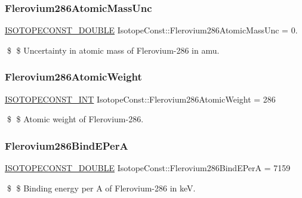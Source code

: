 \subsubsection{\texorpdfstring{Flerovium286\+Atomic\+Mass\+Unc}{Flerovium286AtomicMassUnc}}
{\footnotesize\ttfamily \mbox{\hyperlink{group___isotope_const-_macros_ga8f45a7272ce02c0b4c65c44636ed719a}{I\+S\+O\+T\+O\+P\+E\+C\+O\+N\+S\+T\+\_\+\+D\+O\+U\+B\+LE}} Isotope\+Const\+::\+Flerovium286\+Atomic\+Mass\+Unc = 0.}

\$ \$ Uncertainty in atomic mass of Flerovium-\/286 in amu. \mbox{\label{group___isotope_const-_flerovium-_fl286_ga8382386b9c6b32c2d349fae354067109}} 
\subsubsection{\texorpdfstring{Flerovium286\+Atomic\+Weight}{Flerovium286AtomicWeight}}
{\footnotesize\ttfamily \mbox{\hyperlink{group___isotope_const-_macros_ga5f18360b3e99483a35c32d789e62621c}{I\+S\+O\+T\+O\+P\+E\+C\+O\+N\+S\+T\+\_\+\+I\+NT}} Isotope\+Const\+::\+Flerovium286\+Atomic\+Weight = 286}

\$ \$ Atomic weight of Flerovium-\/286. \mbox{\label{group___isotope_const-_flerovium-_fl286_ga03c7d05a4f075f239303651c3cfb1bf3}} 
\subsubsection{\texorpdfstring{Flerovium286\+Bind\+E\+PerA}{Flerovium286BindEPerA}}
{\footnotesize\ttfamily \mbox{\hyperlink{group___isotope_const-_macros_ga8f45a7272ce02c0b4c65c44636ed719a}{I\+S\+O\+T\+O\+P\+E\+C\+O\+N\+S\+T\+\_\+\+D\+O\+U\+B\+LE}} Isotope\+Const\+::\+Flerovium286\+Bind\+E\+PerA = 7159}

\$ \$ Binding energy per A of Flerovium-\/286 in keV. \mbox{\label{group___isotope_const-_flerovium-_fl286_ga3fb29034412c2370f4706e179c1337b2}} 
